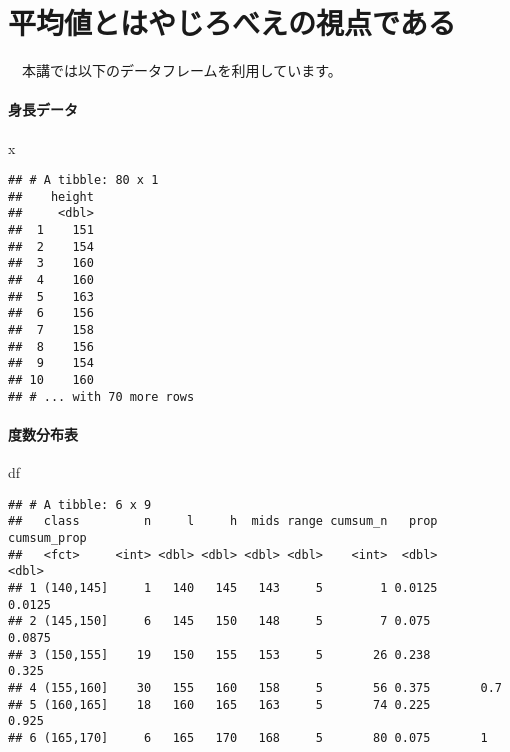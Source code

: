 \documentclass[
  12pt,
]{book}
\newenvironment{Shaded}{\begin{snugshade}}{\end{snugshade}}
\newcommand{\NormalTok}[1]{#1}
\begin{document}
\hypertarget{ux5e73ux5747ux5024ux3068ux306fux3084ux3058ux308dux3079ux3048ux306eux8996ux70b9ux3067ux3042ux308b}{%
\chapter{平均値とはやじろべえの視点である}\label{ux5e73ux5747ux5024ux3068ux306fux3084ux3058ux308dux3079ux3048ux306eux8996ux70b9ux3067ux3042ux308b}}

　本講では以下のデータフレームを利用しています。

\hypertarget{ux8eabux9577ux30c7ux30fcux30bf}{%
\subsubsection*{身長データ}\label{ux8eabux9577ux30c7ux30fcux30bf}}

\begin{Shaded}
\begin{Highlighting}[]
\NormalTok{x}
\end{Highlighting}
\end{Shaded}

\begin{verbatim}
## # A tibble: 80 x 1
##    height
##     <dbl>
##  1    151
##  2    154
##  3    160
##  4    160
##  5    163
##  6    156
##  7    158
##  8    156
##  9    154
## 10    160
## # ... with 70 more rows
\end{verbatim}

\hypertarget{ux5ea6ux6570ux5206ux5e03ux8868}{%
\subsubsection*{度数分布表}\label{ux5ea6ux6570ux5206ux5e03ux8868}}

\begin{Shaded}
\begin{Highlighting}[]
\NormalTok{df}
\end{Highlighting}
\end{Shaded}

\begin{verbatim}
## # A tibble: 6 x 9
##   class         n     l     h  mids range cumsum_n   prop cumsum_prop
##   <fct>     <int> <dbl> <dbl> <dbl> <dbl>    <int>  <dbl>       <dbl>
## 1 (140,145]     1   140   145   143     5        1 0.0125      0.0125
## 2 (145,150]     6   145   150   148     5        7 0.075       0.0875
## 3 (150,155]    19   150   155   153     5       26 0.238       0.325 
## 4 (155,160]    30   155   160   158     5       56 0.375       0.7   
## 5 (160,165]    18   160   165   163     5       74 0.225       0.925 
## 6 (165,170]     6   165   170   168     5       80 0.075       1
\end{verbatim}
\end{document}
